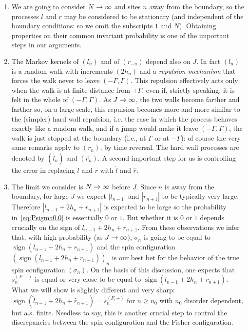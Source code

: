 \documentclass[AHL,Unicode,longabstracts,published]{cedram}
\newcommand{\gG}{\Gamma}
\newcommand{\gs}{\sigma}
\newcommand{\ls}{\widehat{l}}
\newcommand{\rs}{\widehat{r}}
\DeclareMathOperator{\sign}{\mathrm{sign}}
\renewcommand*{\to}{\mathchoice{\longrightarrow}{\rightarrow}{\rightarrow}{\rightarrow}}
\begin{document}
\begin{enumerate}
\item We are going to consider $N \to \infty$ and sites $n$ away from the boundary, so the processes $l$ and $r$ may be considered to be stationary (and independent of the boundary conditions: so we omit the subscripts $1$ and $N$). Obtaining properties on their common invariant probability is one of the important steps in our arguments.
\item The Markov kernels of $(l_n)$ and of $(r_{-n})$ depend also on $J$. In fact $(l_n)$ is a random walk with increments $(2 h_n)$ and a \emph{repulsion mechanism} that forces the walk never to leave $(-\gG, \gG)$. This repulsion effectively acts only when the walk is at finite distance from $\pm \gG$, even if, strictly speaking, it is felt in the whole of $(-\gG, \gG)$. As $J \to \infty$, the two walls become farther and farther so, on a large scale, this repulsion becomes more and more similar to the (simpler) hard wall repulsion, i.e. the case in which the process behaves exactly like a random walk, and if a jump would make it leave $(-\gG, \gG)$, the walk is just stopped at the boundary (i.e., at $\gG$ or at $-\gG$): of course the very same remarks apply to $(r_n)$, by time reversal. The hard wall processes are denoted by $(\widehat l _n)$ and $(\widehat r _n )$. A second important step for us is controlling the error in replacing $l$ and $r$ with $\ls$ and $\rs$.
\item The limit we consider is $N \to \infty$ before $J$. Since $n$ is away from the boundary, for large $J$ we expect $| l_{n-1}|$ and $| r_{n+1}|$ to be typically very large. Therefore $| l_{n-1}+2h_n+r_{n+1}|$ is expected to be large so the probability in~\eqref{eq:Psigma0.0} is essentially $0$ or $1$. But whether it is $0$ or $1$ depends crucially on the sign of $l_{n-1}+2 h_n + r_{n+1}$. From these observations we infer that, with high probability (as $J\to \infty$), $\gs_n$ is going to be equal to $\sign(l_{n-1}+2 h_n + r_{n+1})$ and the spin configuration $(\sign(l_{n-1}+2 h_n + r_{n+1}))_n$ is our best bet for the behavior of the true spin configuration $(\gs_n)$. On the basis of this discussion, one expects that $s^{(F,+)}_n$ is equal or very close to be equal to $\sign(l_{n-1}+2 h_n + r_{n+1})$. What we will show is slightly different and very sharp: $\sign(\ls_{n-1} +2h_n+ \widehat r_{n+1})=s^{(F,+)}_n$ for $n\ge n_0$ with $n_0$ disorder dependent, but a.s. finite. Needless to say, this is another crucial step to control the discrepancies between the spin configuration and the Fisher configuration.
\end{enumerate}
\end{document}
